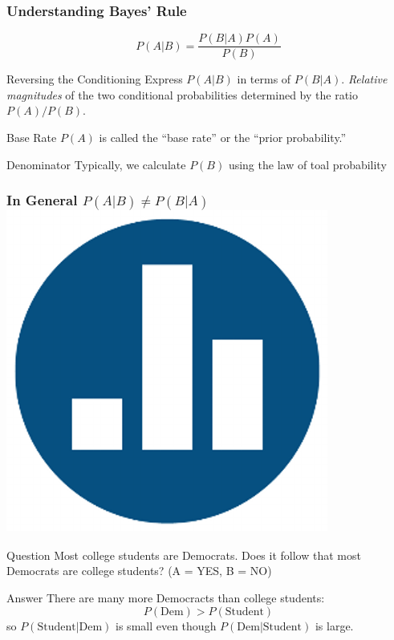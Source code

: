\begin{frame}
\frametitle{Understanding Bayes' Rule}
$$\boxed{P(A|B) = \frac{P(B|A)P(A)}{P(B)}}$$

\begin{block}
	{Reversing the Conditioning}
	Express $P(A|B)$ in terms of $P(B|A)$. \emph{Relative magnitudes} of the two conditional probabilities determined by the ratio $P(A)/P(B)$.
\end{block}

\begin{block}
	{Base Rate}
	$P(A)$ is called the ``base rate'' or the ``prior probability.'' 
\end{block}

\begin{block}
	{Denominator}
	Typically, we calculate $P(B)$ using the law of toal probability
\end{block}


\end{frame}
\begin{frame}
\frametitle{In General $P(A|B) \neq P(B|A)$ \hfill \includegraphics[scale = 0.05]{./images/clicker}} 
\begin{block}{Question}
Most college students are Democrats. Does it follow that most Democrats are college students?  \hfill  \alert{(A = YES, B = NO)}
\end{block}

\pause

\begin{block}{Answer}
There are many more Democracts than college students: 
$$P(\mbox{Dem}) > P(\mbox{Student})$$ 
so $P(\mbox{Student}|\mbox{Dem})$ is small even though $P(\mbox{Dem}|\mbox{Student})$ is large.
\end{block}
\end{frame}
